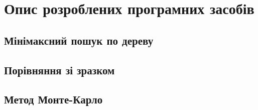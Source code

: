 \newpage
\section{Опис розроблених програмних засобів}
\subsection{Мінімаксний пошук по дереву}
\subsection{Порівняння зі зразком}
\subsection{Метод Монте-Карло}